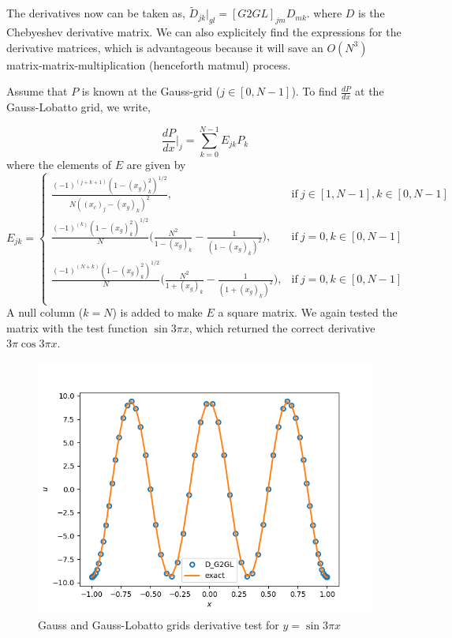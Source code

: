 \documentclass{article}
\begin{document}
The derivatives now can be taken as, $\tilde{D}_{jk} \bigg|_{gl} = [G2GL]_{jm}D_{mk}$. where $D$ is the Chebyeshev derivative matrix. We can also explicitely find the expressions for the derivative matrices, which is advantageous because it will save an $O(N^{3})$ matrix-matrix-multiplication (henceforth matmul) process.

Assume that $P$ is known at the Gauss-grid ($j \in [0, N-1]$). To find $\frac{dP}{dx}$ at the Gauss-Lobatto grid, we write,

\begin{equation}\label{eq:dPdx_at_gl}
 \frac{dP}{dx}\bigg|_{j} = \sum_{k=0}^{N-1} E_{jk} P_{k}
\end{equation}
where the elements of $E$ are given by 
\begin{equation}
 E_{jk} = \begin{cases}
      \frac{(-1)^{(j + k + 1)} (1- (x_{g})_{k}^{2})^{1/2}}{N((x_{c})_{j} - (x_{g})_{k})^{2}}, & \text{if}\ j \in [1, N-1],   k \in [0, N-1] \\
      \frac{(-1)^{(k)} (1- (x_{g})_{k}^{2})^{1/2}}{N}\bigg( \frac{N^{2}}{1-(x_{g})_{k}} - \frac{1}{(1-(x_{g})_{k})^{2}}\bigg), & \text{if}\ j = 0,   k \in [0, N-1] \\
      \frac{(-1)^{(N+k)} (1- (x_{g})_{k}^{2})^{1/2}}{N}\bigg( \frac{N^{2}}{1+(x_{g})_{k}} - \frac{1}{(1+(x_{g})_{k})^{2}}\bigg), & \text{if}\ j = 0,   k \in [0, N-1] \\
    \end{cases}
\end{equation}
A null column ($k=N$) is added to make $E$ a square matrix. We again tested the matrix with the test function $\sin{3\pi x}$, which returned the correct derivative $3\pi\cos{3\pi x}$. 

\begin{figure}[H]
        \centering
    \includegraphics[scale=0.35]{Figs/test_D_g2gl_interpolant.png}
            \caption{Gauss and Gauss-Lobatto grids derivative test for $y = \sin{3\pi x}$ }
        \label{fig:test_D_g2gl_interpolant}
\end{figure}
\end{document}
